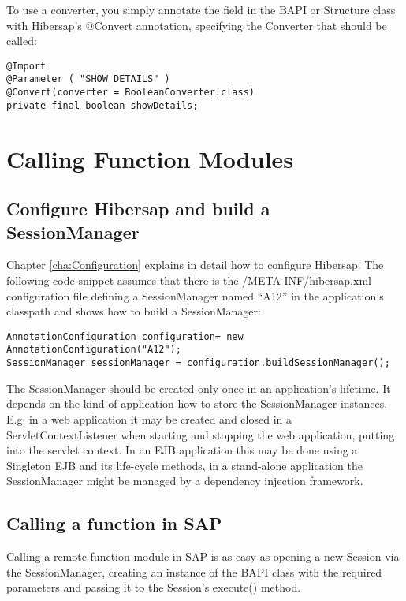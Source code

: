 To use a converter, you simply annotate the field in the BAPI or Structure class with Hibersap's @Convert annotation, specifying the Converter that should be called:
\\
\begin{lstlisting}[caption=Using a converter]
@Import
@Parameter ( "SHOW_DETAILS" )
@Convert(converter = BooleanConverter.class)
private	final boolean showDetails;
\end{lstlisting}

\section{Calling Function Modules}

\subsection{Configure Hibersap and build a SessionManager}
Chapter \ref{cha:Configuration} explains in detail how to configure Hibersap. The following code snippet assumes that there is the /META-INF/hibersap.xml configuration file defining a SessionManager named ``A12'' in the application's classpath and shows how to build a SessionManager:


\begin{lstlisting}[caption=Building the SessionManager]
AnnotationConfiguration configuration= new AnnotationConfiguration("A12"); 
SessionManager sessionManager = configuration.buildSessionManager();
\end{lstlisting}
    
The SessionManager should be created only once in an application's lifetime. It depends on the kind of application how to store the SessionManager instances. E.g. in a web application it may be created and closed in a ServletContextListener when starting and stopping the web application, putting into the servlet context. In an EJB application this may be done using a Singleton EJB and its life-cycle methods, in a stand-alone application the SessionManager might be managed by a dependency injection framework.


\subsection{Calling a function in SAP}

Calling a remote function module in SAP is as easy as opening a new Session via the SessionManager, creating an instance of the BAPI class with the required parameters and passing it to the Session's execute() method.

